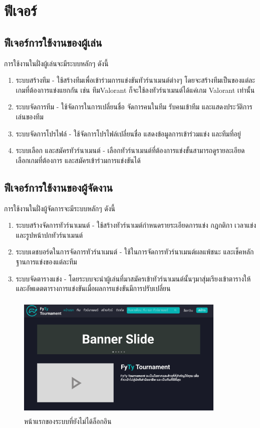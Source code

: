 \section{ฟีเจอร์}
\subsection{ฟีเจอร์การใช้งานของผู้เล่น}
การใช้งานในฝั่งผู้เล่นจะมีระบบหลักๆ ดังนี้
\begin{enumerate}
  \item ระบบสร้างทีม - ใช้สร้างทีมเพื่อเข้าร่วมการแข่งขันทัวร์นาเมนต์ต่างๆ โดยจะสร้างทีมเป็นของแต่ละเกมที่ต้องการแข่งแยกกัน เช่น ทีมValorant ก็จะใช้ลงทัวร์นาเมนต์ได้แค่เกม Valorant เท่านั้น
  \item ระบบจัดการทีม - ใช้จัดการในการเปลี่ยนชื่อ จัดการคนในทีม รับคนเข้าทีม และแสดงประวัติการเล่นของทีม
  \item ระบบจัดการโปรไฟล์ - ใช้จัดการโปรไฟล์เปลี่ยนชื่อ แสดงข้อมูลการเข้าร่วมแข่ง และทีมที่อยู่
  \item ระบบเลือก และสมัครทัวร์นาเมนต์ - เลือกทัวร์นาเมนต์ที่ต้องการแข่งขั้นสามารถดูรายละเอียด เลือกเกมที่ต้องการ และสมัครเข้าร่วมการแข่งขันได้
\end{enumerate}

\subsection{ฟีเจอร์การใช้งานของผู้จัดงาน}
การใช้งานในฝั่งผู้จัดการจะมีระบบหลักๆ ดังนี้
\begin{enumerate}
  \item ระบบสร้างจัดการทัวร์นาเมนต์ - ใช้สร้างทัวร์นาเมต์กำหนดรายระเอียดการแข่ง กฎกติกา เวลาแข่ง และรูปหน้าปกทัวร์นาเมนต์
  \item ระบบเดชบอร์ดในการจัดการทัวร์นาเมนต์ - ใช้ในการจัดการทัวร์นาเมนต์ผลแพ้ชนะ และเช็คหลักฐานการแข่งของแต่ละทีม
  \item ระบบจัดตารางแข่ง - โดยระบบจะนำผู้เล่นที่มาสมัครเข้าทัวร์นาเมนต์นั้นๆมาสุ่มเรียงเข้าตารางให้ และอัพเดตตารางการแข่งขันเมื่อผลการแข่งขันมีการปรับเปลี่ยน
\end{enumerate}

\begin{figure}[h]
  \begin{center}
  \includegraphics[width=10cm,height=6cm,keepaspectratio]{homebf.png}
  \end{center}
  \caption[หน้าแรกของระบบที่ยังไม่ได้ล็อกอิน]{หน้าแรกของระบบที่ยังไม่ได้ล็อกอิน}
  \label{fig:หน้าแรกของระบบที่ยังไม่ได้ล็อกอิน}
\end{figure}

